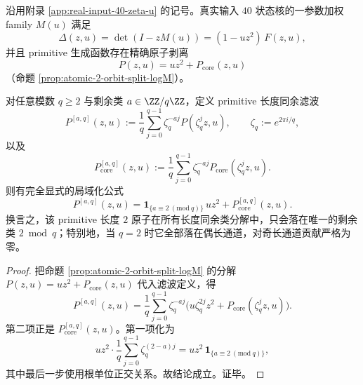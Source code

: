 \begin{theorem}\label{thm:gut-real-input-primitive-2-atom-congruence-localization}
沿用附录 \ref{app:real-input-40-zeta-u} 的记号。真实输入 \(40\) 状态核的一参数加权 family \(M(u)\) 满足
\[
\Delta(z,u)=\det(I-zM(u))=(1-uz^2)\,F(z,u),
\]
并且 primitive 生成函数存在精确原子剥离
\[
P(z,u)=uz^2+P_{\mathrm{core}}(z,u)
\]
（命题 \ref{prop:atomic-2-orbit-split-logM}）。

对任意模数 \(q\ge 2\) 与剩余类 \(a\in\ZZ/q\ZZ\)，定义 primitive 长度同余滤波
\[
P^{[a,q]}(z,u):=\frac1q\sum_{j=0}^{q-1}\zeta_q^{-aj}P(\zeta_q^j z,u),
\qquad \zeta_q:=e^{2\pi i/q},
\]
以及
\[
P_{\mathrm{core}}^{[a,q]}(z,u):=\frac1q\sum_{j=0}^{q-1}\zeta_q^{-aj}P_{\mathrm{core}}(\zeta_q^j z,u).
\]
则有完全显式的局域化公式
\[
\boxed{\;
P^{[a,q]}(z,u)
=
\mathbf 1_{\{a\equiv 2\ (\mathrm{mod}\ q)\}}\,u z^2
+P_{\mathrm{core}}^{[a,q]}(z,u).\;}
\]
换言之，该 primitive 长度 \(2\) 原子在所有长度同余类分解中，只会落在唯一的剩余类 \(2\bmod q\)；特别地，当 \(q=2\) 时它全部落在偶长通道，对奇长通道贡献严格为零。
\end{theorem}
\begin{proof}
把命题 \ref{prop:atomic-2-orbit-split-logM} 的分解
\(
P(z,u)=uz^2+P_{\mathrm{core}}(z,u)
\)
代入滤波定义，得
\[
P^{[a,q]}(z,u)
=\frac1q\sum_{j=0}^{q-1}\zeta_q^{-aj}\bigl(u\zeta_q^{2j}z^2+P_{\mathrm{core}}(\zeta_q^j z,u)\bigr).
\]
第二项正是 \(P_{\mathrm{core}}^{[a,q]}(z,u)\)。第一项化为
\[
u z^2\cdot \frac1q\sum_{j=0}^{q-1}\zeta_q^{(2-a)j}
=u z^2\,\mathbf 1_{\{a\equiv 2\ (\mathrm{mod}\ q)\}},
\]
其中最后一步使用根单位正交关系。故结论成立。证毕。
\end{proof}

